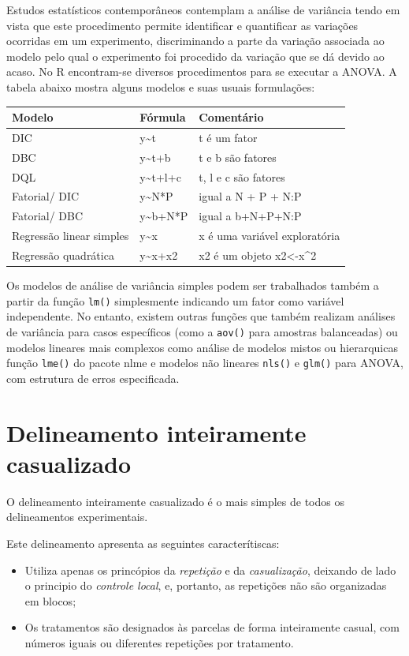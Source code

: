\documentclass[
]{book}
\begin{document}
Estudos estatísticos contemporâneos contemplam a análise de variância tendo em vista que este procedimento permite identificar e quantificar as variações ocorridas em um experimento, discriminando a parte da variação associada ao modelo pelo qual o experimento foi procedido da variação que se dá devido ao acaso.
No R encontram-se diversos procedimentos para se executar a ANOVA. A tabela abaixo mostra alguns modelos e suas usuais formulações:

\begin{longtable}[]{@{}lll@{}}
\toprule
Modelo & Fórmula & Comentário\tabularnewline
\midrule
\endhead
DIC & y\textasciitilde t & t é um fator\tabularnewline
DBC & y\textasciitilde t+b & t e b são fatores\tabularnewline
DQL & y\textasciitilde t+l+c & t, l e c são fatores\tabularnewline
Fatorial/ DIC & y\textasciitilde N*P & igual a N + P + N:P\tabularnewline
Fatorial/ DBC & y\textasciitilde b+N*P & igual a b+N+P+N:P\tabularnewline
Regressão linear simples & y\textasciitilde x & x é uma variável exploratória\tabularnewline
Regressão quadrática & y\textasciitilde x+x2 & x2 é um objeto x2\textless-x\^{}2\tabularnewline
\bottomrule
\end{longtable}

Os modelos de análise de variância simples podem ser trabalhados também a partir da função \texttt{lm()} simplesmente indicando um fator como variável independente. No entanto, existem outras funções que também realizam análises de variância para casos específicos (como a \texttt{aov()} para amostras balanceadas) ou modelos lineares mais complexos como análise de modelos mistos ou hierarquicas função \texttt{lme()} do pacote nlme e modelos não lineares \texttt{nls()} e \texttt{glm()} para ANOVA, com estrutura de erros especificada.

\hypertarget{delineamento-inteiramente-casualizado}{%
\section{Delineamento inteiramente casualizado}\label{delineamento-inteiramente-casualizado}}

O delineamento inteiramente casualizado é o mais simples de todos os delineamentos experimentais.

Este delineamento apresenta as seguintes caracterítiscas:

\begin{itemize}
\item
  Utiliza apenas os princópios da \emph{repetição} e da \emph{casualização}, deixando de lado o principio do \emph{controle local}, e, portanto, as repetições não são organizadas em blocos;
\item
  Os tratamentos são designados às parcelas de forma inteiramente casual, com números iguais ou diferentes repetições por tratamento.
\end{itemize}
\end{document}
